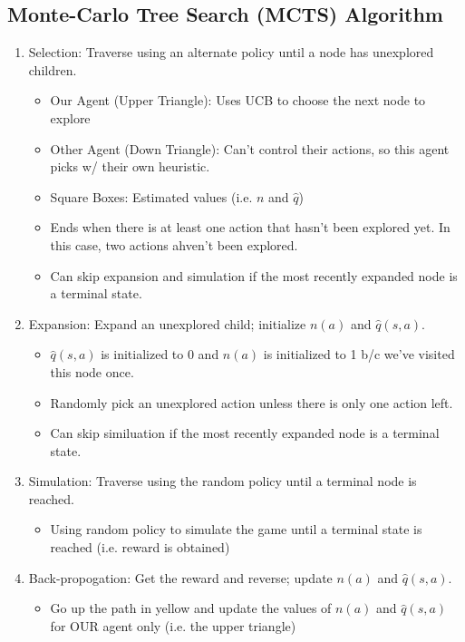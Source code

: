 \subsection{Monte-Carlo Tree Search (MCTS) Algorithm}
\begin{algo}
    \begin{enumerate}
        \item Selection: Traverse using an alternate policy until a node has unexplored children. 
        \begin{itemize}
            \item Our Agent (Upper Triangle): Uses UCB to choose the next node to explore
            \item Other Agent (Down Triangle): Can't control their actions, so this agent picks w/ their own heuristic.
            \item Square Boxes: Estimated values (i.e. $n$ and $\hat{q}$)
            \item Ends when there is at least one action that hasn't been explored yet. In this case, two actions ahven't been explored. 
            \item Can skip expansion and simulation if the most recently expanded node is a terminal state.
        \end{itemize}
        \item Expansion: Expand an unexplored child; initialize $n(a)$ and $\hat{q}(s,a)$.
        \begin{itemize}
            \item $\hat{q}(s,a)$ is initialized to 0 and $n(a)$ is initialized to 1 b/c we've visited this node once.
            \item Randomly pick an unexplored action unless there is only one action left.
            \item Can skip similuation if the most recently expanded node is a terminal state. 
        \end{itemize}
        \item Simulation: Traverse using the random policy until a terminal node is reached. 
        \begin{itemize}
            \item Using random policy to simulate the game until a terminal state is reached (i.e. reward is obtained)
        \end{itemize}
        \item Back-propogation: Get the reward and reverse; update $n(a)$ and $\hat{q}(s,a)$.
        \begin{itemize}
            \item Go up the path in yellow and update the values of $n(a)$ and $\hat{q}(s,a)$ for OUR agent only (i.e. the upper triangle)
        \end{itemize}
    \end{enumerate}
\end{algo}

